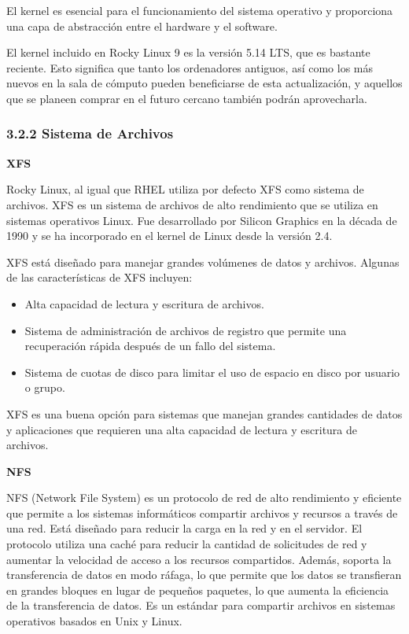 \begin{spacing}{1.5}
    El kernel es esencial para el funcionamiento del sistema operativo y proporciona una capa de abstracción entre el hardware y el software.  \cite{RHEL-kernel-1}

    El kernel incluido en Rocky Linux 9 es la versión 5.14 LTS, que es bastante reciente. Esto significa que tanto los ordenadores antiguos, así como los más nuevos en la sala de cómputo pueden beneficiarse de esta actualización, y aquellos que se planeen comprar en el futuro cercano también podrán aprovecharla. \cite{RL9-release-1}

    \subsubsection{3.2.2 Sistema de Archivos}

    \textbf{XFS}
    
    Rocky Linux, al igual que RHEL utiliza por defecto XFS como sistema de archivos. XFS es un sistema de archivos de alto rendimiento que se utiliza en sistemas operativos Linux. Fue desarrollado por Silicon Graphics en la década de 1990 y se ha incorporado en el kernel de Linux desde la versión 2.4.

    XFS está diseñado para manejar grandes volúmenes de datos y archivos. Algunas de las características de XFS incluyen:

    \begin{itemize}
        \item Alta capacidad de lectura y escritura de archivos.
        \item Sistema de administración de archivos de registro que permite una recuperación rápida después de un fallo del sistema.
        \item Sistema de cuotas de disco para limitar el uso de espacio en disco por usuario o grupo.
    \end{itemize}

    XFS es una buena opción para sistemas que manejan grandes cantidades de datos y aplicaciones que requieren una alta capacidad de lectura y escritura de archivos. \cite{RHEL-XFS-1}

    \textbf{NFS}
    
    NFS (Network File System) es un protocolo de red de alto rendimiento y eficiente que permite a los sistemas informáticos compartir archivos y recursos a través de una red. Está diseñado para reducir la carga en la red y en el servidor. El protocolo utiliza una caché para reducir la cantidad de solicitudes de red y aumentar la velocidad de acceso a los recursos compartidos. Además, soporta la transferencia de datos en modo ráfaga, lo que permite que los datos se transfieran en grandes bloques en lugar de pequeños paquetes, lo que aumenta la eficiencia de la transferencia de datos. Es un estándar para compartir archivos en sistemas operativos basados en Unix y Linux.


\end{spacing}
